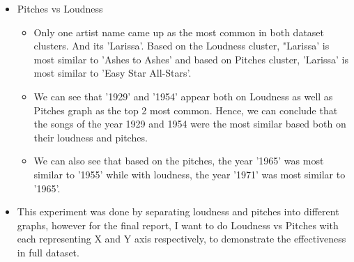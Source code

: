 \documentclass[11pt]{article}
\begin{document}
\begin{itemize}
\item Pitches vs Loudness
\begin{itemize}
	\item Only one artist name came up as the most common in both dataset clusters. And its 'Larissa'. Based on the Loudness cluster, "Larissa' is most similar to 'Ashes to Ashes' and based on Pitches cluster, 'Larissa' is most similar to 'Easy Star All-Stars'. 
	\item We can see that '1929' and '1954' appear both on Loudness as well as Pitches graph as the top 2 most common. Hence, we can conclude that the songs of the year 1929 and 1954 were the most similar based both on their loudness and pitches.
	\item We can also see that based on the pitches, the year '1965' was most similar to '1955' while with loudness, the year '1971' was most similar to '1965'. 
\end{itemize}
\item This experiment was done by separating loudness and pitches into different graphs, however for the final report, I want to do Loudness vs Pitches with each representing X and Y axis respectively, to demonstrate the effectiveness in full dataset.
\end{itemize}
\end{document}
